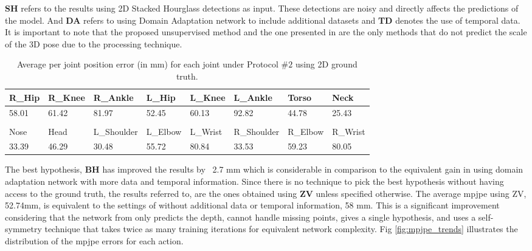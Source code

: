 

\textbf{SH} refers to the results using 2D Stacked Hourglass detections as input. These detections are noisy and directly affects the predictions of the model. And \textbf{DA} refers to using Domain Adaptation network to include additional datasets and \textbf{TD} denotes the use of temporal data. It is important to note that the proposed unsupervised method and the one presented in \cite{amazon1} are the only methods that do not predict the scale of the 3D pose due to the processing technique.

\begin{table}[h]
    \centering
    \begin{tabularx}{\textwidth}{llllllll}
        R\_Hip & R\_Knee & R\_Ankle    & L\_Hip   & L\_Knee  & L\_Ankle    & Torso    & Neck \\
        \hline
        58.01  & 61.42   & 81.97       & 52.45    & 60.13    & 92.82       & 44.78    & 25.43 \\
        &&&&&&&\\
        Nose   & Head    & L\_Shoulder & L\_Elbow & L\_Wrist & R\_Shoulder & R\_Elbow & R\_Wrist\\
        \hline
        33.39  & 46.29   & 30.48       & 55.72    & 80.84    & 33.53       & 59.23    & 80.05\\
    \end{tabularx}
    \caption{Average per joint position error (in mm) for each joint under Protocol $\#2$ using 2D ground truth.}
    \label{table:pjpe}
\end{table}

The best hypothesis, \textbf{BH} has improved the results by ~2.7 mm which is considerable in comparison to the equivalent gain in \cite{amazon1} using domain adaptation network with more data and temporal information. Since there is no technique to pick the best hypothesis without having access to the ground truth, the results referred to, are the ones obtained using \textbf{ZV} unless specified otherwise. The average \ac{mpjpe} using ZV, 52.74mm, is equivalent to the settings of \cite{amazon1} without additional data or temporal information, 58 mm. This is a significant improvement considering that the network from \cite{amazon1} only predicts the depth, cannot handle missing points, gives a single hypothesis, and uses a self-symmetry technique that takes twice as many training iterations for equivalent network complexity. Fig \ref{fig:mpjpe_trends} illustrates the distribution of the \ac{mpjpe} errors for each action.

